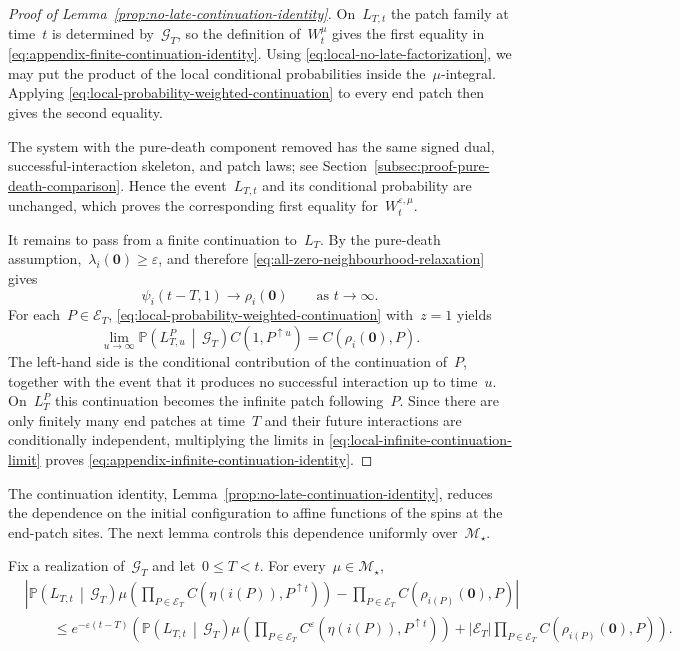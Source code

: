 \documentclass[EJP,preprint,NODS,nobera]{ejpecp}
\newcommand{\pP}{\mathbb{P}}
\newcommand{\CP}[2]{\pP\bb{#1\,\middle|\,#2}}
\newcommand{\bb}[1]{\left(#1\right)}
\newcommand{\abs}[1]{\left|#1\right|}
\newcommand{\mb}[1]{\mathbf{#1}}
\begin{document}
\begin{proof}[Proof of Lemma~\ref{prop:no-late-continuation-identity}]
On~$L_{T,t}$ the patch family at time~$t$ is determined by~$\mathcal G_T$, so the definition of~$W_t^\mu$ gives the first equality in
\eqref{eq:appendix-finite-continuation-identity}. Using
\eqref{eq:local-no-late-factorization}, we may put the product of the local
conditional probabilities inside the~$\mu$-integral. Applying
\eqref{eq:local-probability-weighted-continuation} to every end patch then
gives the second equality.

The system with the pure-death component removed has the same signed dual,
successful-interaction skeleton, and patch laws; see
Section~\ref{subsec:proof-pure-death-comparison}. Hence the event~$L_{T,t}$ and its conditional probability are unchanged, which proves the
corresponding first equality for~$W_t^{\varepsilon,\mu}$.

It remains to pass from a finite continuation to~$L_T$. By the pure-death
assumption,~$\lambda_i(\mb 0)\geq\varepsilon$, and therefore
\eqref{eq:all-zero-neighbourhood-relaxation} gives
\begin{equation*}
\psi_i(t-T,1)\longrightarrow\rho_i(\mb 0)
\qquad\text{as }t\to\infty.
\end{equation*}
For each~$P\in\mathcal E_T$,
\eqref{eq:local-probability-weighted-continuation} with~$z=1$ yields
\begin{equation}
\label{eq:local-infinite-continuation-limit}
\lim_{u\to\infty}
\CP{L_{T,u}^P}{\mathcal G_T}
C\bb{1,P^{\uparrow u}}
=
C\bb{\rho_i(\mb 0),P}.
\end{equation}
The left-hand side is the conditional contribution of the continuation of~$P$, together with the event that it produces no successful interaction up to
time~$u$. On~$L_T^P$ this continuation becomes the infinite patch following~$P$. Since there are only finitely many end patches at time~$T$ and their
future interactions are conditionally independent, multiplying the limits in
\eqref{eq:local-infinite-continuation-limit} proves
\eqref{eq:appendix-infinite-continuation-identity}.
\end{proof}

The continuation identity, Lemma~\ref{prop:no-late-continuation-identity}, reduces the dependence on the initial configuration
to affine functions of the spins at the end-patch sites. The next lemma
controls this dependence uniformly over~$\mathcal M_\star$.

\begin{lemma}
\label{lem:end-factor-relaxation}
Fix a realization of~$\mathcal G_T$ and let~$0\leq T<t$. For every~$\mu\in\mathcal M_\star$,
\begin{align*}
&\abs{
 \CP{L_{T,t}}{\mathcal G_T}
 \mu\bb{
  \prod_{P\in\mathcal E_T}
  C\bb{\eta\bb{i(P)},P^{\uparrow t}}
 }
 -
 \prod_{P\in\mathcal E_T}
 C\bb{\rho_{i(P)}(\mb 0),P}
}
\\
&\qquad\leq
e^{-\varepsilon(t-T)}
\bb{
 \CP{L_{T,t}}{\mathcal G_T}
 \mu\bb{
  \prod_{P\in\mathcal E_T}
  C^\varepsilon\bb{\eta\bb{i(P)},P^{\uparrow t}}
 }
 +
 \abs{\mathcal E_T}
 \prod_{P\in\mathcal E_T}
 C\bb{\rho_{i(P)}(\mb 0),P}
}.
\end{align*}
\end{lemma}
\end{document}
